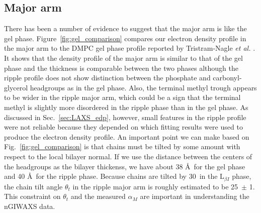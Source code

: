 \subsection{Major arm}
There has been a number of evidence to suggest that the major arm is like 
the gel phase. Figure~\ref{fig:gel_comparison} compares our electron density
profile in the major arm to the DMPC gel phase profile reported by 
Tristram-Nagle \textit{et al.} \cite{Tristram-Nagle02}. 
It shows that the density profile of the major arm is similar to that 
of the gel phase and the thickness is comparable between the two phases
although the ripple profile does not show distinction
between the phosphate and carbonyl-glycerol headgroups as in the gel phase.
Also, the terminal methyl trough appears to be wider in the ripple major arm,
which could be a sign that the terminal methyl is slightly more disordered
in the ripple phase than in the gel phase.
As discussed in
Sec.~\ref{sec:LAXS_edp}, however, small features in the ripple profile were not
reliable because they depended on which fitting results were used
to produce the electron density profile.
An important point we can make based on Fig.~\ref{fig:gel_comparison} 
is that chains must be tilted by some amount with respect to the local bilayer
normal. If we use the distance between the centers of the headgroups as the
bilayer thickenss, we have about 38 \AA\ for the gel phase and 40 \AA\
for the ripple phase. Because chains are tilted by 30\textdegree\ in the 
L$_{\beta I}$ phase, the chain tilt angle $\theta_t$ in the ripple major 
arm is roughly estimated to be 25\textdegree\ $\pm$ 1\textdegree. This constraint on $\theta_t$
and the measured $\alpha_M$ are important in understanding the nGIWAXS data.


